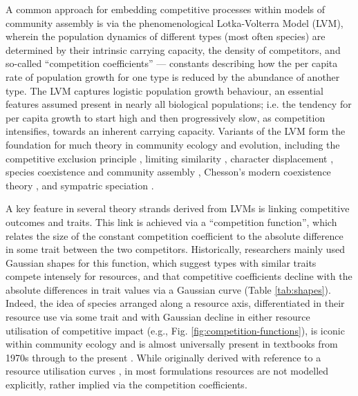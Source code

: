 \documentclass[a4paper,11pt]{article}
\begin{document}
A common approach for embedding competitive processes within models of community assembly is via the phenomenological Lotka-Volterra Model (LVM), wherein the  population dynamics of different types (most often species) are determined by their intrinsic carrying capacity, the density of competitors, and so-called ``competition coefficients'' \citep{Lotka-1925, Volterra-1926} --- constants describing how the per capita rate of population growth for one type is reduced by the abundance of another type. The LVM captures logistic population growth behaviour, an essential features assumed present in nearly all biological populations; i.e. the tendency for per capita growth to start high and then progressively slow, as competition intensifies, towards an inherent carrying capacity. Variants of the LVM form the foundation for much theory in community ecology and evolution, including the competitive exclusion principle \citep{Gause-1934}, limiting similarity \citep{MacArthur-1967, May-1972, Slatkin-1980, Abrams-1983}, character displacement \citep{Taper-1985, Case-2000}, species coexistence and community assembly \citep{MacArthur-1967, Calcagno-2006, Leimar-2013, DAndrea-2019}, Chesson's modern coexistence theory \citep{Chesson-2000,Barabas-2018}, and sympatric speciation \citep{Dieckmann-1999}.

A key feature in several theory strands derived from LVMs is linking competitive outcomes and traits. This link is achieved via a ``competition function'', which relates the size of the constant competition coefficient to the absolute difference in some trait between the two competitors. Historically, researchers mainly used Gaussian shapes for this function, which suggest types with similar traits compete intensely for resources, and that competitive coefficients decline with the absolute differences in trait values via a Gaussian curve (Table \ref{tab:shapes}). Indeed, the idea of species arranged along a resource axis, differentiated in their resource use via some trait and with Gaussian decline in either resource utilisation of competitive impact (e.g., Fig. \ref{fig:competition-functions}), is iconic within community ecology and is almost universally present in textbooks from 1970s through to the present \citep[e.g.,][]{Krebs-1972, Ricklefs-1973, Ricklefs-1999, Krebs-2013}. While originally derived with reference to a resource utilisation curves \citep{MacArthur-1967, Roughgarden-1979}, in most formulations resources are not modelled explicitly, rather implied via the competition coefficients.
\end{document}
